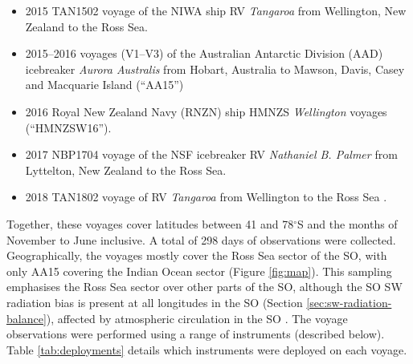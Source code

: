 \begin{itemize}
\item 2015 TAN1502 voyage of the NIWA ship RV \textit{Tangaroa} from Wellington,
New Zealand to the Ross Sea.
\item 2015--2016 voyages (V1--V3) of the Australian Antarctic Division (AAD)
icebreaker \textit{Aurora Australis} from Hobart, Australia to Mawson, Davis,
Casey and Macquarie Island (``AA15'')
\item 2016 Royal New Zealand Navy (RNZN) ship HMNZS \textit{Wellington} voyages
(``HMNZSW16'').
\item 2017 NBP1704 voyage of the NSF icebreaker RV \textit{Nathaniel B. Palmer}
from Lyttelton, New Zealand to the Ross Sea.
\item 2018 TAN1802 voyage of RV \textit{Tangaroa} from Wellington to the Ross
Sea \citep{hartery2019}.
\end{itemize}

Together, these voyages cover latitudes between 41 and 78$^\circ$S and the
months of November to June inclusive. A total of 298 days of observations were
collected. Geographically, the voyages mostly cover the Ross Sea sector of the
SO, with only AA15 covering the Indian Ocean sector (Figure \ref{fig:map}). This
sampling emphasises the Ross Sea sector over other parts of the SO, although the
SO SW radiation bias is present at all longitudes in the SO (Section
\ref{sec:sw-radiation-balance}), affected by atmospheric circulation in the SO
\citep{jones1993,sinclair1994,sinclair1995,simmonds2000,simmonds2003,simmonds2003a,hoskins2005,hodges2011}.
The voyage observations were performed using a range of instruments (described
below). Table \ref{tab:deployments} details which instruments were deployed on
each voyage.

